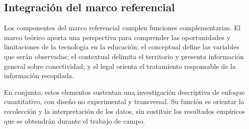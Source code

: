 \subsection{Integración del marco referencial}

Los componentes del marco referencial cumplen funciones complementarias. El marco teórico aporta una perspectiva para comprender las oportunidades y limitaciones de la tecnología en la educación; el conceptual define las variables que serán observadas; el contextual delimita el territorio y presenta información general sobre conectividad; y el legal orienta el tratamiento responsable de la información recopilada.

En conjunto, estos elementos sustentan una investigación descriptiva de enfoque cuantitativo, con diseño no experimental y transversal. Su función es orientar la recolección y la interpretación de los datos, sin sustituir los resultados empíricos que se obtendrán durante el trabajo de campo.


\newpage